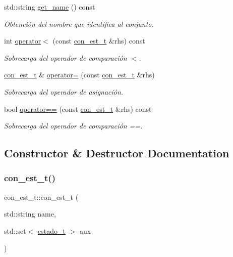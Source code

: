 \begin{DoxyCompactItemize}
std\+::string \hyperlink{classcon__est__t_a3529d902b7b1fed03bd7d6dc58adfa21}{get\+\_\+name} () const
\begin{DoxyCompactList}\small\item\em Obtención del nombre que identifica al conjunto. \end{DoxyCompactList}\item 
int \hyperlink{classcon__est__t_a4c7c0ded0fd4ff7c1a1ab4ec34a48bc8}{operator$<$} (const \hyperlink{classcon__est__t}{con\+\_\+est\+\_\+t} \&rhs) const
\begin{DoxyCompactList}\small\item\em Sobrecarga del operador de comparación $<$. \end{DoxyCompactList}\item 
\hyperlink{classcon__est__t}{con\+\_\+est\+\_\+t} \& \hyperlink{classcon__est__t_a0cafe8405d65c85598d36a5ca8785a30}{operator=} (const \hyperlink{classcon__est__t}{con\+\_\+est\+\_\+t} \&rhs)
\begin{DoxyCompactList}\small\item\em Sobrecarga del operador de asignación. \end{DoxyCompactList}\item 
bool \hyperlink{classcon__est__t_a1ff2060fab48cff33abe98f57b6bfd58}{operator==} (const \hyperlink{classcon__est__t}{con\+\_\+est\+\_\+t} \&rhs) const
\begin{DoxyCompactList}\small\item\em Sobrecarga del operador de comparación ==. \end{DoxyCompactList}\end{DoxyCompactItemize}


\subsection{Constructor \& Destructor Documentation}
\mbox{\label{classcon__est__t_ac3ae8315196a410571f03bc1f7ec54e3}} 
\subsubsection{\texorpdfstring{con\+\_\+est\+\_\+t()}{con\_est\_t()}\hspace{0.1cm}{\footnotesize\ttfamily [1/2]}}
{\footnotesize\ttfamily con\+\_\+est\+\_\+t\+::con\+\_\+est\+\_\+t (\begin{DoxyParamCaption}\item[{std\+::string}]{name,  }\item[{std\+::set$<$ \hyperlink{classestado__t}{estado\+\_\+t} $>$}]{aux }\end{DoxyParamCaption})}



